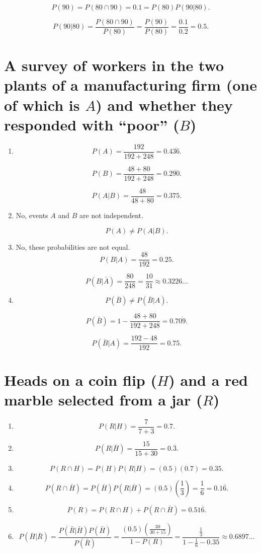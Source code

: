 \documentclass[12pt]{article}
\begin{document}
\[P(90)=P(80\cap 90)=0.1=P(80)P(90|80).\]

\[P(90|80)=\frac{P(80\cap 90)}{P(80)}=\frac{P(90)}{P(80)}=\frac{0.1}{0.2}=0.5.\]
\section{A survey of workers in the two plants of a manufacturing firm (one of which is $A$) and whether they responded with ``poor'' ($B$)}
\begin{enumerate}
\item 
\[P(A)=\frac{192}{192+248}=0.4\overline{36}.\]

\[P(B)=\frac{48+80}{192+248}=0.2\overline{90}.\]

\[P(A|B)=\frac{48}{48+80}=0.375.\]
\item No, events $A$ and $B$ are not independent.

\[P(A)\neq P(A|B).\]
\item No, these probabilities are not equal.
\[P(B|A)=\frac{48}{192}=0.25.\]

\[P(B|\bar{A})=\frac{80}{248}=\frac{10}{31}\approx 0.3226\dots\]
\item
\[P(\bar{B})\neq P(\bar{B}|A).\]

\[P(\bar{B})=1-\frac{48+80}{192+248}=0.7\overline{09}.\]

\[P(\bar{B}|A)=\frac{192-48}{192}=0.75.\]
\end{enumerate}
\section{Heads on a coin flip ($H$) and a red marble selected from a jar ($R$)}
\begin{enumerate}
    \item\[P(R|H)=\frac{7}{7+3}=0.7.\]
    \item\[P(R|\bar{H})=\frac{15}{15+30}=0.\overline{3}.\]
    \item\[P(R\cap H)=P(H)P(R|H)=(0.5)(0.7)=0.35.\]
    \item\[P(R\cap\bar{H})=P(\bar{H})P(R|\bar{H})=(0.5)\left(\frac{1}{3}\right)=\frac{1}{6}= 0.1\overline{6}.\]
    \item\[P(R)=P(R\cap H)+P(R\cap\bar{H})=0.51\overline{6}.\]
    \item\[P(\bar{H}|\bar{R})=\frac{P(\bar{R}|\bar{H})P(\bar{H})}{P(\bar{R})}=\frac{(0.5)(\frac{30}{30+15})}{1-P(R)}=\frac{\frac{1}{3}}{1-\frac{1}{6}-0.35}\approx 0.6897\dots\]
\end{enumerate}
\end{document}
